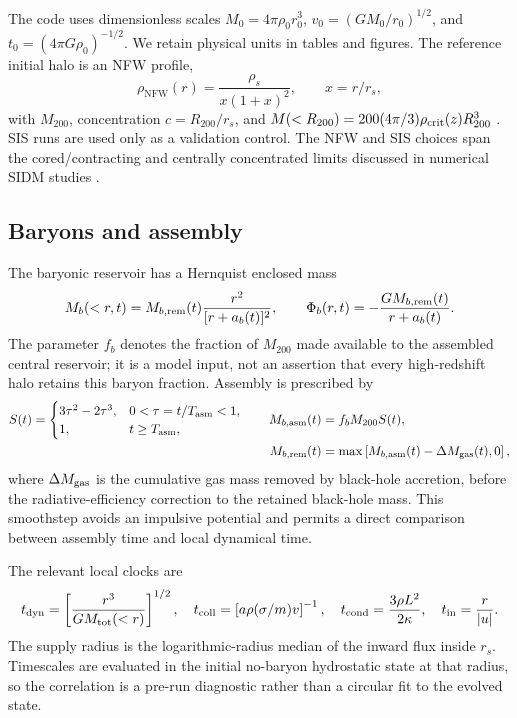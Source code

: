 \documentclass[11pt]{article}
\newcommand{\NFW}{\mathrm{NFW}}
\begin{document}
The code uses dimensionless scales $M_0=4\pi\rho_0r_0^3$, $v_0=(GM_0/r_0)^{1/2}$, and $t_0=(4\pi G\rho_0)^{-1/2}$.  We retain physical units in tables and figures.  The reference initial halo is an NFW profile,
\begin{equation}
 \rho_{\NFW}(r)=\frac{\rho_s}{x(1+x)^2},\qquad x=r/r_s,
\end{equation}
with $M_{200}$, concentration $c=R_{200}/r_s$, and $M(<R_{200})=200(4\pi/3)\rho_{\rm crit}(z)R_{200}^3$ \citep{BryanNorman1998}.  SIS runs are used only as a validation control.  The NFW and SIS choices span the cored/contracting and centrally concentrated limits discussed in numerical SIDM studies \citep{Navarro1997,Dave2001,Rocha2013,Peter2013,Vogelsberger2012,Robertson2017}.

\subsection{Baryons and assembly}

The baryonic reservoir has a Hernquist enclosed mass
\begin{equation}
 M_b(<r,t)=M_{b,\rm rem}(t)\frac{r^2}{[r+a_b(t)]^2},
 \qquad \Phi_b(r,t)=-\frac{G M_{b,\rm rem}(t)}{r+a_b(t)} .
\end{equation}
The parameter $f_b$ denotes the fraction of $M_{200}$ made available to the assembled central reservoir; it is a model input, not an assertion that every high-redshift halo retains this baryon fraction.  Assembly is prescribed by
\begin{align}
 S(t)=\begin{cases}3\tau^2-2\tau^3,&0<\tau=t/T_{\rm asm}<1,\\1,&t\ge T_{\rm asm},\end{cases}
 \qquad M_{b,\rm asm}(t)&=f_bM_{200}S(t),\\
 M_{b,\rm rem}(t)&=\max\left[M_{b,\rm asm}(t)-\Delta M_{\rm gas}(t),0\right],
 \label{eq:assembly}
\end{align}
where $\Delta M_{\rm gas}$ is the cumulative gas mass removed by black-hole accretion, before the radiative-efficiency correction to the retained black-hole mass.  This smoothstep avoids an impulsive potential and permits a direct comparison between assembly time and local dynamical time.

The relevant local clocks are
\begin{equation}
 t_{\rm dyn}=\left[\frac{r^3}{G M_{\rm tot}(<r)}\right]^{1/2},\quad
 t_{\rm coll}=\left[a\rho(\sigma/m)v\right]^{-1},\quad
 t_{\rm cond}=\frac{3\rho L^2}{2\kappa},\quad
 t_{\rm in}=\frac{r}{|u|} .
 \label{eq:clocks}
\end{equation}
The supply radius is the logarithmic-radius median of the inward flux inside $r_s$.  Timescales are evaluated in the initial no-baryon hydrostatic state at that radius, so the correlation is a pre-run diagnostic rather than a circular fit to the evolved state.
\end{document}
